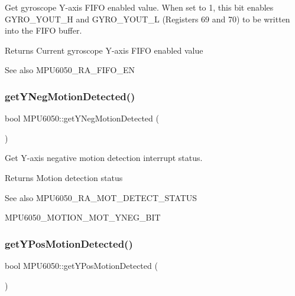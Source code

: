 Get gyroscope Y-\/axis F\+I\+FO enabled value. When set to 1, this bit enables G\+Y\+R\+O\+\_\+\+Y\+O\+U\+T\+\_\+H and G\+Y\+R\+O\+\_\+\+Y\+O\+U\+T\+\_\+L (Registers 69 and 70) to be written into the F\+I\+FO buffer. \begin{DoxyReturn}{Returns}
Current gyroscope Y-\/axis F\+I\+FO enabled value 
\end{DoxyReturn}
\begin{DoxySeeAlso}{See also}
M\+P\+U6050\+\_\+\+R\+A\+\_\+\+F\+I\+F\+O\+\_\+\+EN 
\end{DoxySeeAlso}
\mbox{\label{class_m_p_u6050_a6c45be7b4aa9081c83ee0f4081bf0827}} 
\subsubsection{\texorpdfstring{getYNegMotionDetected()}{getYNegMotionDetected()}}
{\footnotesize\ttfamily bool M\+P\+U6050\+::get\+Y\+Neg\+Motion\+Detected (\begin{DoxyParamCaption}{ }\end{DoxyParamCaption})}

Get Y-\/axis negative motion detection interrupt status. \begin{DoxyReturn}{Returns}
Motion detection status 
\end{DoxyReturn}
\begin{DoxySeeAlso}{See also}
M\+P\+U6050\+\_\+\+R\+A\+\_\+\+M\+O\+T\+\_\+\+D\+E\+T\+E\+C\+T\+\_\+\+S\+T\+A\+T\+US 

M\+P\+U6050\+\_\+\+M\+O\+T\+I\+O\+N\+\_\+\+M\+O\+T\+\_\+\+Y\+N\+E\+G\+\_\+\+B\+IT 
\end{DoxySeeAlso}
\mbox{\label{class_m_p_u6050_ad959ec84b9fe9f7e416b7af252f37abc}} 
\subsubsection{\texorpdfstring{getYPosMotionDetected()}{getYPosMotionDetected()}}
{\footnotesize\ttfamily bool M\+P\+U6050\+::get\+Y\+Pos\+Motion\+Detected (\begin{DoxyParamCaption}{ }\end{DoxyParamCaption})}

